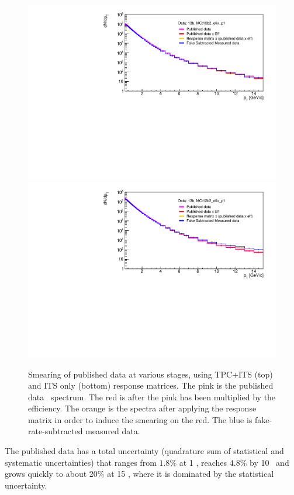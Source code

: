 \begin{figure}[htpb]
\centering
\includegraphics[width=.95\textwidth]{Data_Analysis/Tracking/refolding_pPb_tpc_MBMC_0GeV15GeV_dNdpt.pdf}
\includegraphics[width=.95\textwidth]{Data_Analysis/Tracking/refolding_pPb_its_MBMC_0GeV15GeV_dNdpt.pdf}
\caption{Smearing of published data at various stages, using TPC+ITS (top) and ITS only (bottom) response matrices. The pink is the published data \pt~spectrum. The red is after the pink has been multiplied by the efficiency. The orange is the spectra after applying the response matrix in order to induce the smearing on the red. The blue is fake-rate-subtracted measured data.}
\label{fig:RefoldedComparisonSpectra}
\end{figure}

The published data has a total uncertainty (quadrature sum of statistical and systematic uncertainties) that ranges from $1.8\%$ at 1 \GeVc, reaches $4.8\%$ by 10 \GeVc~and grows quickly to about 20$\%$ at 15 \GeVc, where it is dominated by the statistical uncertainty. 

